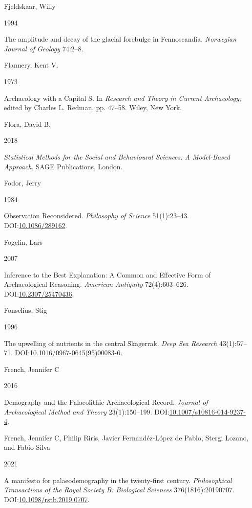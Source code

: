 \documentclass[
  12pt,
  a4paper,
  oneside]{book}
\newlength{\cslhangindent}
\newlength{\csllabelwidth}
\newlength{\cslentryspacingunit} %
\newenvironment{CSLReferences}[2] %
 {%
  \setlength{\parindent}{0pt}
  \ifodd #1
  \let\oldpar\par
  \def\par{\hangindent=\cslhangindent\oldpar}
  \fi
  \setlength{\parskip}{#2\cslentryspacingunit}
 }%
 {}
\newcommand{\CSLBlock}[1]{#1\hfill\break}
\newcommand{\CSLLeftMargin}[1]{\parbox[t]{\csllabelwidth}{#1}}
\newcommand{\CSLRightInline}[1]{\parbox[t]{\linewidth - \csllabelwidth}{#1}\break}
\begin{document}
\begin{CSLReferences}{0}{0}
\leavevmode{}%
\CSLBlock{Fjeldskaar, Willy}
\CSLLeftMargin{ 1994}%
\CSLRightInline{{The amplitude and decay of the glacial forebulge in Fennoscandia}. \emph{Norwegian Journal of Geology} 74:2--8.}

\leavevmode{}%
\CSLBlock{Flannery, Kent V.}
\CSLLeftMargin{ 1973}%
\CSLRightInline{{Archaeology with a Capital S}. In \emph{{Research and Theory in Current Archaeology}}, edited by Charles L. Redman, pp. 47--58. Wiley, New York.}

\leavevmode{}%
\CSLBlock{Flora, David B.}
\CSLLeftMargin{ 2018}%
\CSLRightInline{\emph{{Statistical Methods for the Social and Behavioural Sciences: A Model-Based Approach}}. SAGE Publications, London.}

\leavevmode{}%
\CSLBlock{Fodor, Jerry}
\CSLLeftMargin{ 1984}%
\CSLRightInline{Observation Reconsidered. \emph{Philosophy of Science} 51(1):23--43. DOI:\href{https://doi.org/10.1086/289162}{10.1086/289162}.}

\leavevmode{}%
\CSLBlock{Fogelin, Lars}
\CSLLeftMargin{ 2007}%
\CSLRightInline{Inference to the Best Explanation: A Common and Effective Form of Archaeological Reasoning. \emph{American Antiquity} 72(4):603--626. DOI:\href{https://doi.org/10.2307/25470436}{10.2307/25470436}.}

\leavevmode{}%
\CSLBlock{Fonselius, Stig}
\CSLLeftMargin{ 1996}%
\CSLRightInline{{The upwelling of nutrients in the central Skagerrak}. \emph{Deep Sea Research} 43(1):57--71. DOI:\href{https://doi.org/10.1016/0967-0645(95)00083-6}{10.1016/0967-0645(95)00083-6}.}

\leavevmode{}%
\CSLBlock{French, Jennifer C}
\CSLLeftMargin{ 2016}%
\CSLRightInline{Demography and the Palaeolithic Archaeological Record. \emph{Journal of Archaeological Method and Theory} 23(1):150--199. DOI:\href{https://doi.org/10.1007/s10816-014-9237-4}{10.1007/s10816-014-9237-4}.}

\leavevmode{}%
\CSLBlock{French, Jennifer C, Philip Riris, Javier Fernandéz-López de Pablo, Stergi Lozano, and Fabio Silva}
\CSLLeftMargin{ 2021}%
\CSLRightInline{A manifesto for palaeodemography in the twenty-first century. \emph{Philosophical Transactions of the Royal Society B: Biological Sciences} 376(1816):20190707. DOI:\href{https://doi.org/10.1098/rstb.2019.0707}{10.1098/rstb.2019.0707}.}


\end{CSLReferences}
\end{document}
